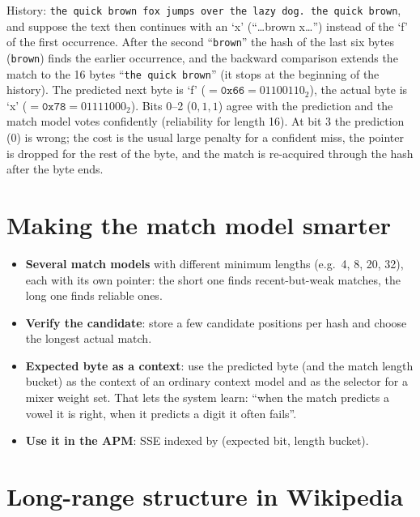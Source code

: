 \documentclass[11pt,a4paper,openany]{book}
\theoremstyle{definition}
\theoremstyle{remark}
\begin{document}
\begin{example}
History: \texttt{the quick brown fox jumps over the lazy dog. the quick brown\textvisiblespace}, and suppose the text then continues with an `x' (``\ldots{}brown x\ldots{}'') instead of the `f' of the first occurrence. After the second ``\texttt{brown\textvisiblespace}'' the hash of the last six bytes (\texttt{brown\textvisiblespace}) finds the earlier occurrence, and the backward comparison extends the match to the 16 bytes ``\texttt{the quick brown\textvisiblespace}'' (it stops at the beginning of the history). The predicted next byte is `f' ($=\texttt{0x66}=01100110_2$), the actual byte is `x' ($=\texttt{0x78}=01111000_2$). Bits 0--2 ($0,1,1$) agree with the prediction and the match model votes confidently (reliability for length 16). At bit 3 the prediction (0) is wrong; the cost is the usual large penalty for a confident miss, the pointer is dropped for the rest of the byte, and the match is re-acquired through the hash after the byte ends.
\end{example}

\section{Making the match model smarter}

\begin{itemize}
\item \textbf{Several match models} with different minimum lengths (e.g.\ 4, 8, 20, 32), each with its own pointer: the short one finds recent-but-weak matches, the long one finds reliable ones.
\item \textbf{Verify the candidate}: store a few candidate positions per hash and choose the longest actual match.
\item \textbf{Expected byte as a context}: use the predicted byte (and the match length bucket) as the context of an ordinary context model and as the selector for a mixer weight set. That lets the system learn: ``when the match predicts a vowel it is right, when it predicts a digit it often fails''.
\item \textbf{Use it in the APM}: SSE indexed by (expected bit, length bucket).
\end{itemize}

\section{Long-range structure in Wikipedia}
\end{document}
